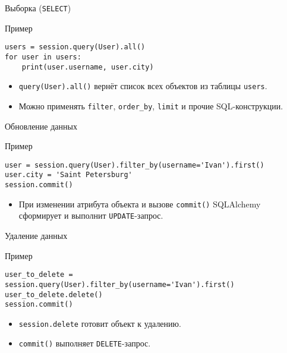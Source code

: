 \documentclass{beamer}
\begin{document}
\begin{frame}[fragile]{Выборка (\texttt{SELECT})}
	\begin{block}{Пример}
		\begin{verbatim}
users = session.query(User).all()
for user in users:
    print(user.username, user.city)
\end{verbatim}
	\end{block}

	\begin{itemize}
		\item \texttt{query(User).all()} вернёт список всех объектов из таблицы \texttt{users}.
		\item Можно применять \texttt{filter}, \texttt{order\_by}, \texttt{limit} и прочие SQL-конструкции.
	\end{itemize}
\end{frame}

\begin{frame}[fragile]{Обновление данных}
	\begin{block}{Пример}
		\begin{verbatim}
user = session.query(User).filter_by(username='Ivan').first()
user.city = 'Saint Petersburg'
session.commit()
\end{verbatim}
	\end{block}

	\begin{itemize}
		\item При изменении атрибута объекта и вызове \texttt{commit()} SQLAlchemy сформирует и выполнит \texttt{UPDATE}-запрос.
	\end{itemize}
\end{frame}

\begin{frame}[fragile]{Удаление данных}
	\begin{block}{Пример}
		\begin{verbatim}
user_to_delete = session.query(User).filter_by(username='Ivan').first()
user_to_delete.delete()
session.commit()
\end{verbatim}
	\end{block}

	\begin{itemize}
		\item \texttt{session.delete} готовит объект к удалению.
		\item \texttt{commit()} выполняет \texttt{DELETE}-запрос.
	\end{itemize}
\end{frame}
\end{document}
